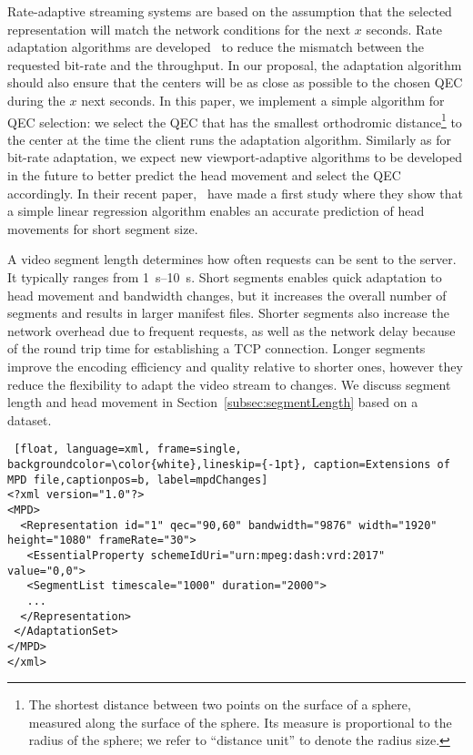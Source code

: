 Rate-adaptive streaming systems are based on the assumption that
the selected representation will match the network
conditions for the next $x$ seconds. Rate adaptation algorithms
are
developed~\cite{tian,probe_li_2014,miller,zou,liu} to reduce the mismatch between the
requested bit-rate and the throughput. In our proposal, the adaptation algorithm should also ensure
that the \FoV{} centers will be as close as possible to the chosen \ac{QEC} during
the $x$ next seconds.
In this paper, we implement
a simple algorithm for \ac{QEC} selection: we select the \ac{QEC} that
has the smallest orthodromic distance\footnote{The shortest distance
between two points on the surface of a sphere, measured along the
surface of the sphere. Its measure is proportional to the radius
of the sphere; we refer to ``distance unit'' to denote the
radius size.} to the \FoV{} center at the time the client runs
the adaptation algorithm. Similarly as for bit-rate adaptation, we
expect new viewport-adaptive algorithms to be developed in
the future to better predict the head movement and select the
\ac{QEC} accordingly. In their recent paper,~\citet{allthings} have
made a first study where they show that a simple linear regression algorithm
enables an accurate prediction of head movements for short segment size.



A video segment length determines how
often requests can be sent to the server. It typically ranges from
\SIrange{1}{10}{\second}. Short segments enables quick
adaptation to head movement and bandwidth changes, but it increases
the overall number of segments and results in larger manifest files.
Shorter segments also increase the network overhead due to
frequent requests, as well as the network delay because of the round
trip time for establishing a TCP connection.
Longer segments improve the encoding efficiency and quality relative to
shorter ones, however they reduce the flexibility to adapt the video
stream to changes. We discuss segment length and head movement in
Section~\ref{subsec:segmentLength} based on a dataset.



\begin{lstlisting} [float, language=xml, frame=single, backgroundcolor=\color{white},lineskip={-1pt}, caption=Extensions of MPD file,captionpos=b, label=mpdChanges]
<?xml version="1.0"?>
<MPD>
  <Representation id="1" qec="90,60" bandwidth="9876" width="1920" height="1080" frameRate="30">
   <EssentialProperty schemeIdUri="urn:mpeg:dash:vrd:2017" value="0,0">
   <SegmentList timescale="1000" duration="2000">
   ...
  </Representation>
 </AdaptationSet>
</MPD>
</xml>
\end{lstlisting}

